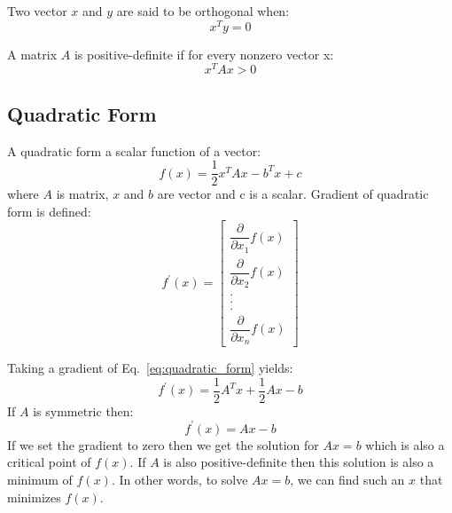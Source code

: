 \documentclass[en]{minipw} %
\begin{document}
Two vector $x$ and $y$ are said to be orthogonal when:
\begin{equation}
x^{T}y = 0
\end{equation}

A matrix $A$ is positive-definite if for every nonzero vector x:
\begin{equation}
x^{T}Ax > 0
\end{equation}

\subsection{Quadratic Form}
A quadratic form a scalar function of a vector:
\begin{equation}
\label{eq:quadratic_form}
f(x) = \dfrac{1}{2}x^{T}Ax - b^{T}x + c
\end{equation}
where $A$ is matrix, $x$ and $b$ are vector and c is a scalar.
Gradient of quadratic form is defined:
\begin{equation}
\label{eq:gradient_f}
f^{'}(x) = 
\begin{bmatrix}
\dfrac{\partial}{\partial x_1} f(x) \\
\dfrac{\partial}{\partial x_2} f(x) \\
. \\
. \\
. \\
\dfrac{\partial}{\partial x_n} f(x)
\end{bmatrix}
\end{equation}

Taking a gradient of Eq.~\ref{eq:quadratic_form} yields:
\begin{equation}
f^{'}(x) = \dfrac{1}{2}A^{T}x + \dfrac{1}{2}Ax - b
\end{equation}
If $A$ is symmetric then:
\begin{equation}
f^{'}(x) = Ax - b
\end{equation}
If we set the gradient to zero then we get the solution for $Ax=b$ which is also a critical point of $f(x)$. If $A$ is also positive-definite then this solution is also a minimum of $f(x)$. In other words, to solve $Ax=b$, we can find such an $x$ that minimizes $f(x)$.
\end{document}
